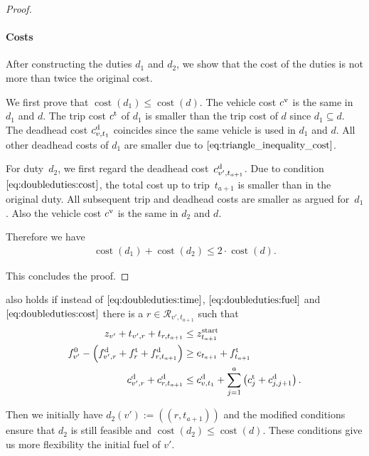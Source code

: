 \begin{proof}
\paragraph{Costs} \proofparfill

After constructing the duties $d_1$ and $d_2$, we show that the cost of the duties is not more than twice the original cost.

We first prove that ${\operatorname{cost}\left(d_1\right)\leq\operatorname{cost}\left(d\right)}$. The vehicle cost $c^{\operatorname{v}}$ is the same in $d_1$ and $d$. The trip cost $c^{\operatorname{t}}$ of $d_1$ is smaller than the trip cost of $d$ since ${d_1\subseteq d}$. The deadhead cost $c^{\operatorname{d}}_{v,t_1}$ coincides since the same vehicle is used in $d_1$ and $d$. All other deadhead costs of $d_1$ are smaller due to $\eqref{eq:triangle_inequality_cost}$.

For duty~$d_2$, we first regard the deadhead cost~$c^{\operatorname{d}}_{v',t_{a+1}}$. Due to condition~$\eqref{eq:doubleduties:cost}$, the total cost up to trip~$t_{a+1}$ is smaller than in the original duty. All subsequent trip and deadhead costs are smaller as argued for~$d_1$. Also the vehicle cost $c^{\operatorname{v}}$ is the same in $d_2$ and $d$.

Therefore we have
\begin{align*}
	\operatorname{cost}\left(d_1\right)+\operatorname{cost}\left(d_2\right)\leq 2\cdot\operatorname{cost}\left(d\right).
\end{align*}

This concludes the proof.
%
\end{proof}

\begin{remark}
\label{rem:doubleduties}

 also holds if instead of $\eqref{eq:doubleduties:time}$, $\eqref{eq:doubleduties:fuel}$ and $\eqref{eq:doubleduties:cost}$ there is a ${r\in\mathcal{R}_{v',t_{a+1}}}$ such that
\begin{align}
	z_{v'} + t_{v',r} + t_{r,t_{a+1}} & \leq z^{\operatorname{start}}_{t_{a+1}} \label{eq:doubleduties:time_r} \\
	f^0_{v'} - \left(f^{\operatorname{d}}_{v',r}+f^{\operatorname{t}}_r+f^{\operatorname{d}}_{r,t_{a+1}}\right) & \geq e_{t_{a+1}} + f^{\operatorname{t}}_{t_{a+1}} \label{eq:doubleduties:fuel_r} \\
	c^{\operatorname{d}}_{v',r}+c^{\operatorname{d}}_{r,t_{a+1}} & \leq c^{\operatorname{d}}_{v,t_1} + \sum_{j=1}^a \left(c^{\operatorname{t}}_j + c^{\operatorname{d}}_{j,j+1}\right). \label{eq:doubleduties:cost_r}
\end{align}

Then we initially have $d_2(v'):=\left(\left(r,t_{a+1}\right)\right)$ and the modified conditions ensure that $d_2$ is still feasible and ${\operatorname{cost}\left(d_2\right)\leq\operatorname{cost}\left(d\right)}$. These conditions give us more flexibility \wrt the initial fuel of $v'$.

\end{remark}

